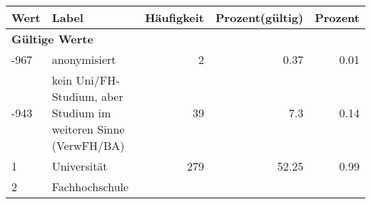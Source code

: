      \begin{longtable}{lXrrr}
     \toprule
     \textbf{Wert} & \textbf{Label} & \textbf{Häufigkeit} & \textbf{Prozent(gültig)} & \textbf{Prozent} \\
     \endhead
     \midrule
     \multicolumn{5}{l}{\textbf{Gültige Werte}}\\

     -967 &
     \multicolumn{1}{X}{ anonymisiert   } &


       \num{2} &
       \num[round-mode=places,round-precision=2]{0,37} &
         \num[round-mode=places,round-precision=2]{0,01} \\

     -943 &
     \multicolumn{1}{X}{ kein Uni/FH-Studium, aber Studium im weiteren Sinne (VerwFH/BA)   } &


       \num{39} &
       \num[round-mode=places,round-precision=2]{7,3} &
         \num[round-mode=places,round-precision=2]{0,14} \\

     1 &
     \multicolumn{1}{X}{ Universität   } &


       \num{279} &
       \num[round-mode=places,round-precision=2]{52,25} &
         \num[round-mode=places,round-precision=2]{0,99} \\

     2 &
     \multicolumn{1}{X}{ Fachhochschule   } &



\end{longtable}
